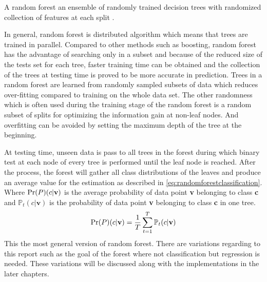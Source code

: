A random forest an ensemble of randomly trained decision trees with randomized collection of features at each split \cite{DFMS}.

In general, random forest is distributed algorithm which means that trees are trained in parallel. Compared to other methods such as boosting, random forest has the advantage of searching only in a subset and because of the reduced size of the tests set for each tree, faster training time can be obtained and the collection of the trees at testing time is proved to be more accurate in prediction. Trees in a random forest are learned from randomly sampled subsets of data which reduces over-fitting compared to training on the whole data set. \cite{GFRF, MVDT,RFML} The other randomness which is often used during the training stage of the random forest is a random subset of splits for optimizing the information gain at non-leaf nodes\cite{GFRF}. And overfitting can be avoided by setting the maximum depth of the tree at the beginning. 

At testing time, unseen data is pass to all trees in the forest during which binary test at each node of every tree is performed until the leaf node is reached. After the process, the forest will gather all class distributions of the leaves and produce an average value for the estimation as described in \eqref{eq:randomforestclassification}. Where $ \Pr(P)(c|\mathbf{v})$ is the average probability of data point \textbf{v} belonging to class \textbf{c} and $\mathbb{P}_{t}(c|\mathbf{v})$ is the probability of data point \textbf{v} belonging to class \textbf{c} in one tree.
\begin{equation}
\label{eq:randomforestclassification}
	\Pr(P)(c|\mathbf{v}) = \frac{1}{T}\sum\limits_{t=1}^T \mathbb{P}_{t}(c|\mathbf{v})
\end{equation}
This the most general version of random forest. There are variations regarding to this report such as the goal of the forest where not classification but regression is needed. These variations will be discussed along with the implementations in the later chapters.
